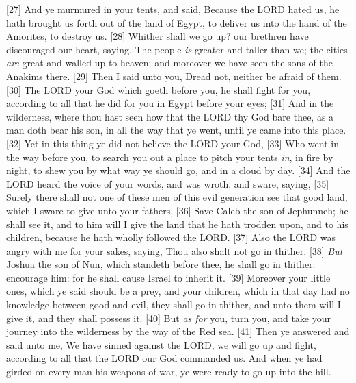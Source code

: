 [27] \textcolor[rgb]{0.00,0.00,1.00}{And ye murmured in your tents, and said, Because the LORD hated us, he hath brought us forth out of the land of Egypt, to deliver us into the hand of the Amorites, to destroy us.}
[28] \textcolor[rgb]{0.00,0.00,1.00}{Whither shall we go up? our brethren have discouraged our heart, saying, The people \emph{is} greater and taller than we; the cities \emph{are} great and walled up to heaven; and moreover we have seen the sons of the Anakims there.}
[29] \textcolor[rgb]{0.00,0.00,1.00}{Then I said unto you, Dread not, neither be afraid of them.}
[30] \textcolor[rgb]{0.00,0.00,1.00}{The LORD your God which goeth before you, he shall fight for you, according to all that he did for you in Egypt before your eyes;}
[31] \textcolor[rgb]{0.00,0.00,1.00}{And in the wilderness, where thou hast seen how that the LORD thy God bare thee, as a man doth bear his son, in all the way that ye went, until ye came into this place.}
[32] \textcolor[rgb]{0.00,0.00,1.00}{Yet in this thing ye did not believe the LORD your God,}
[33] \textcolor[rgb]{0.00,0.00,1.00}{Who went in the way before you, to search you out a place to pitch your tents \emph{in}, in fire by night, to shew you by what way ye should go, and in a cloud by day.}
[34] \textcolor[rgb]{0.00,0.00,1.00}{And the LORD heard the voice of your words, and was wroth, and sware, saying,}
[35] \textcolor[rgb]{0.00,0.00,1.00}{Surely there shall not one of these men of this evil generation see that good land, which I sware to give unto your fathers,}
[36] \textcolor[rgb]{0.00,0.00,1.00}{Save Caleb the son of Jephunneh; he shall see it, and to him will I give the land that he hath trodden upon, and to his children, because he hath wholly followed the LORD.}
[37] \textcolor[rgb]{0.00,0.00,1.00}{Also the LORD was angry with me for your sakes, saying, Thou also shalt not go in thither.}
[38] \textcolor[rgb]{0.00,0.00,1.00}{\emph{But} Joshua the son of Nun, which standeth before thee, he shall go in thither: encourage him: for he shall cause Israel to inherit it.}
[39] \textcolor[rgb]{0.00,0.00,1.00}{Moreover your little ones, which ye said should be a prey, and your children, which in that day had no knowledge between good and evil, they shall go in thither, and unto them will I give it, and they shall possess it.}
[40] \textcolor[rgb]{0.00,0.00,1.00}{But \emph{as for} you, turn you, and take your journey into the wilderness by the way of the Red sea.}
[41] \textcolor[rgb]{0.00,0.00,1.00}{Then ye answered and said unto me, We have sinned against the LORD, we will go up and fight, according to all that the LORD our God commanded us. And when ye had girded on every man his weapons of war, ye were ready to go up into the hill.}
